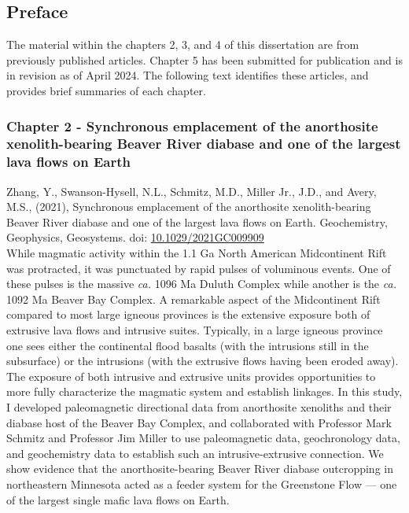 \documentclass{ucbthesis}
\begin{document}
\begin{frontmatter}

\tableofcontents
\clearpage
\listoffigures
\clearpage
\listoftables

\clearpage


\chapter*{Preface}

The material within the chapters 2, 3, and 4 of this dissertation are from previously published articles. Chapter 5 has been submitted for publication and is in revision as of April 2024. The following text identifies these articles, and provides brief summaries of each chapter.

\subsection{Chapter 2 - Synchronous emplacement of the anorthosite xenolith-bearing Beaver River diabase and one of the largest lava flows on Earth}

Zhang, Y., Swanson-Hysell, N.L., Schmitz, M.D., Miller Jr., J.D., and Avery, M.S., (2021), Synchronous emplacement of the anorthosite xenolith-bearing Beaver River diabase and one of the largest lava flows on Earth. Geochemistry, Geophysics, Geosystems. doi: \url{10.1029/2021GC009909}
\\

While magmatic activity within the 1.1 Ga North American Midcontinent Rift was protracted, it was punctuated by rapid pulses of voluminous events. One of these pulses is the massive \textit{ca.} 1096 Ma Duluth Complex while another is the \textit{ca.} 1092 Ma Beaver Bay Complex. A remarkable aspect of the Midcontinent Rift compared to most large igneous provinces is the extensive exposure both of extrusive lava flows and intrusive suites. Typically, in a large igneous province one sees either the continental flood basalts (with the intrusions still in the subsurface) or the intrusions (with the extrusive flows having been eroded away). The exposure of both intrusive and extrusive units provides opportunities to more fully characterize the magmatic system and establish linkages. In this study, I developed paleomagnetic directional data from anorthosite xenoliths and their diabase host of the Beaver Bay Complex, and collaborated with Professor Mark Schmitz and Professor Jim Miller to use paleomagnetic data, geochronology data, and geochemistry data to establish such an intrusive-extrusive connection. We show evidence that the anorthosite-bearing Beaver River diabase outcropping in northeastern Minnesota acted as a feeder system for the Greenstone Flow --- one of the largest single mafic lava flows on Earth.


\end{frontmatter}
\end{document}
